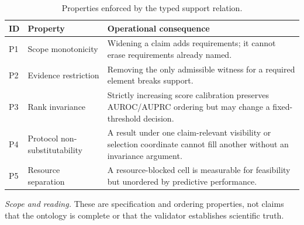 \begin{table}[tbp]
\centering
\footnotesize
\setlength{\tabcolsep}{3.2pt}
\renewcommand{\arraystretch}{1.12}
\caption{Properties enforced by the typed support relation.}
\label{tab:s-support-properties}
\begin{tabularx}{\textwidth}{@{}l >{\raggedright\arraybackslash}p{} Y@{}}
\toprule
\textbf{ID} & \textbf{Property} & \textbf{Operational consequence} \\
\midrule
P1 & Scope monotonicity & Widening a claim adds requirements; it cannot erase requirements already named. \\
P2 & Evidence restriction & Removing the only admissible witness for a required element breaks support. \\
P3 & Rank invariance & Strictly increasing score calibration preserves AUROC/AUPRC ordering but may change a fixed-threshold decision. \\
P4 & Protocol non-substitutability & A result under one claim-relevant visibility or selection coordinate cannot fill another without an invariance argument. \\
P5 & Resource separation & A resource-blocked cell is measurable for feasibility but unordered by predictive performance. \\
\bottomrule
\end{tabularx}
\vspace{2pt}
\begin{minipage}{\textwidth}\footnotesize\emph{Scope and reading.} These are specification and ordering properties, not claims that the ontology is complete or that the validator establishes scientific truth.\end{minipage}
\end{table}
